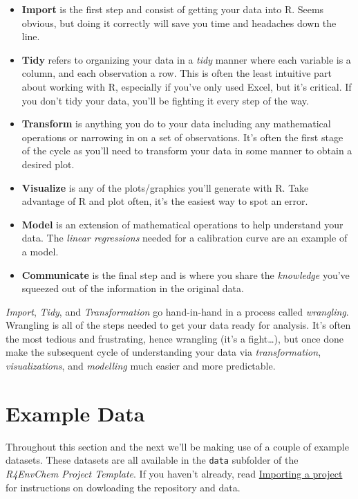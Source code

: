 \documentclass[
]{book}
\providecommand{\tightlist}{%
  \setlength{\itemsep}{0pt}\setlength{\parskip}{0pt}}
\begin{document}
\begin{itemize}
\tightlist
\item
  \textbf{Import} is the first step and consist of getting your data into R. Seems obvious, but doing it correctly will save you time and headaches down the line.
\item
  \textbf{Tidy} refers to organizing your data in a \emph{tidy} manner where each variable is a column, and each observation a row. This is often the least intuitive part about working with R, especially if you've only used Excel, but it's critical. If you don't tidy your data, you'll be fighting it every step of the way.
\item
  \textbf{Transform} is anything you do to your data including any mathematical operations or narrowing in on a set of observations. It's often the first stage of the cycle as you'll need to transform your data in some manner to obtain a desired plot.
\item
  \textbf{Visualize} is any of the plots/graphics you'll generate with R. Take advantage of R and plot often, it's the easiest way to spot an error.
\item
  \textbf{Model} is an extension of mathematical operations to help understand your data. The \emph{linear regressions} needed for a calibration curve are an example of a model.
\item
  \textbf{Communicate} is the final step and is where you share the \emph{knowledge} you've squeezed out of the information in the original data.
\end{itemize}

\emph{Import}, \emph{Tidy}, and \emph{Transformation} go hand-in-hand in a process called \emph{wrangling}. Wrangling is all of the steps needed to get your data ready for analysis. It's often the most tedious and frustrating, hence wrangling (it's a fight\ldots), but once done make the subsequent cycle of understanding your data via \emph{transformation}, \emph{visualizations}, and \emph{modelling} much easier and more predictable.

\hypertarget{example-data}{%
\section{Example Data}\label{example-data}}

Throughout this section and the next we'll be making use of a couple of example datasets. These datasets are all available in the \texttt{data} subfolder of the \emph{R4EnvChem Project Template}. If you haven't already, read \protect\hyperlink{importing-a-project}{Importing a project} for instructions on dowloading the repository and data.
\end{document}
